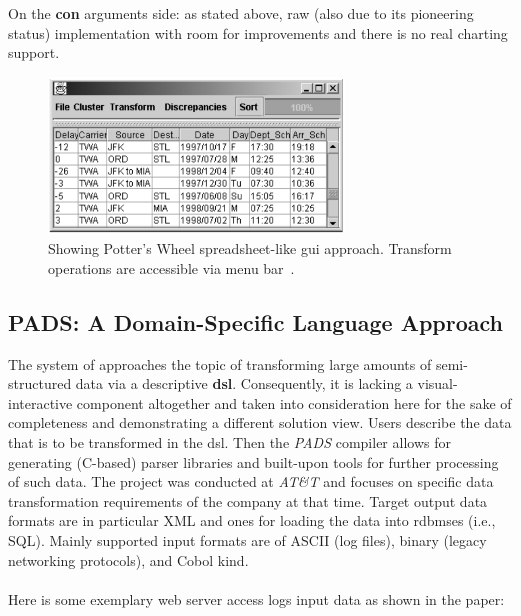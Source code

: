 On the \textbf{con} arguments side: as stated above, raw (also due to its pioneering status) implementation with room for improvements and there is no real charting support.

\begin{figure}[h]
  \centering
  \includegraphics[width=0.7\textwidth]{figures/state-of-the-art/potters-wheel}
  \caption{Showing Potter's Wheel spreadsheet-like \gls{gui} approach. Transform operations are accessible via menu bar~\cite{Raman2001a}.}
  \label{fig:potters-wheel-screenshot}
\end{figure}


\subsection{PADS: A Domain-Specific Language Approach}

The system of \cite{Fisher2005} approaches the topic of transforming large amounts of semi-structured data via a descriptive \textbf{\gls{dsl}}.
Consequently, it is lacking a visual-interactive component altogether and taken into consideration here for the sake of completeness and demonstrating a different solution view.
Users describe the data that is to be transformed in the \gls{dsl}.
Then the \emph{PADS} compiler allows for generating (\textsc{C}-based) parser libraries and built-upon tools for further processing of such data.
The project was conducted at \emph{AT\&T} and focuses on specific data transformation requirements of the company at that time.
Target output data formats are in particular \textsc{XML} and ones for loading the data into \gls{rdbms}es (i.e., \textsc{SQL}).
Mainly supported input formats are of \textsc{ASCII} (log files), binary (legacy networking protocols), and Cobol kind.
\\\\
Here is some exemplary web server access logs input data as shown in the paper:

